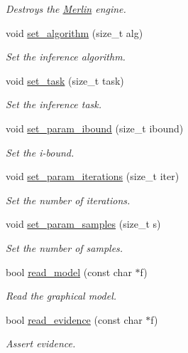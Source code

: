 \begin{DoxyCompactItemize}
\begin{DoxyCompactList}\small\item\em Destroys the \hyperlink{classMerlin}{Merlin} engine. \end{DoxyCompactList}\item 
void \hyperlink{classMerlin_ace7eaef0491f3df0a611ced2cca2bb64}{set\+\_\+algorithm} (size\+\_\+t alg)
\begin{DoxyCompactList}\small\item\em Set the inference algorithm. \end{DoxyCompactList}\item 
void \hyperlink{classMerlin_ad19ecb3ca412ea73e31957f6211ec3bc}{set\+\_\+task} (size\+\_\+t task)
\begin{DoxyCompactList}\small\item\em Set the inference task. \end{DoxyCompactList}\item 
void \hyperlink{classMerlin_a705faedd6fceb577f5ab905bae15fccc}{set\+\_\+param\+\_\+ibound} (size\+\_\+t ibound)
\begin{DoxyCompactList}\small\item\em Set the i-\/bound. \end{DoxyCompactList}\item 
void \hyperlink{classMerlin_aeed11e66a08f12721cc289e3ee40b468}{set\+\_\+param\+\_\+iterations} (size\+\_\+t iter)
\begin{DoxyCompactList}\small\item\em Set the number of iterations. \end{DoxyCompactList}\item 
void \hyperlink{classMerlin_a38bcd618a470b2146148388cfbaa1315}{set\+\_\+param\+\_\+samples} (size\+\_\+t s)
\begin{DoxyCompactList}\small\item\em Set the number of samples. \end{DoxyCompactList}\item 
bool \hyperlink{classMerlin_a3542dc4ce5dbc199a67bf1c6d56c79b5}{read\+\_\+model} (const char $\ast$f)
\begin{DoxyCompactList}\small\item\em Read the graphical model. \end{DoxyCompactList}\item 
bool \hyperlink{classMerlin_ac1e9b4b0d5b41005658929cfdd3b05ff}{read\+\_\+evidence} (const char $\ast$f)
\begin{DoxyCompactList}\small\item\em Assert evidence. \end{DoxyCompactList}\item 

\end{DoxyCompactItemize}
